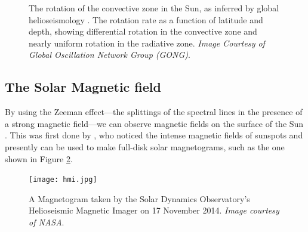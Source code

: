 \documentclass[11pt,a4paper,onecolumn]{report}
\begin{document}
\begin{figure}[t]%
  \centering
  \qquad
  \caption[]{ The rotation of the convective zone
    in the Sun, as inferred by global helioseismology
    \citep{thompson_helioseismology_2004}.  The
    rotation rate as a function of latitude and depth, showing differential
    rotation in the convective zone and nearly uniform rotation in the radiative
    zone. \textit{Image Courtesy of Global Oscillation Network Group
    (GONG)\footnotemark }.}
  \label{fig:solar_rotation}
\end{figure}



\subsection{The Solar Magnetic field}
%
\label{sec:dynamo}

By using the Zeeman effect---the splittings of the spectral lines in the presence of
a strong magnetic field---we can observe magnetic fields on the surface of
the Sun \citep{zeeman_over_1896}. This was first done by \citet{hale_probable_1908}, who noticed the
intense magnetic fields of sunspots and presently can be used to make full-disk
solar magnetograms, such as the one shown in Figure \ref{fig:hmi}.
\\
\begin{figure}[t]
  \centering
  \texttt{[image: hmi.jpg]}
  \caption{A Magnetogram taken by the Solar Dynamics Observatory's Helioseismic
  Magnetic Imager on 17 November 2014. \textit{Image courtesy of NASA}.}
  \label{fig:hmi}
\end{figure}
\end{document}
